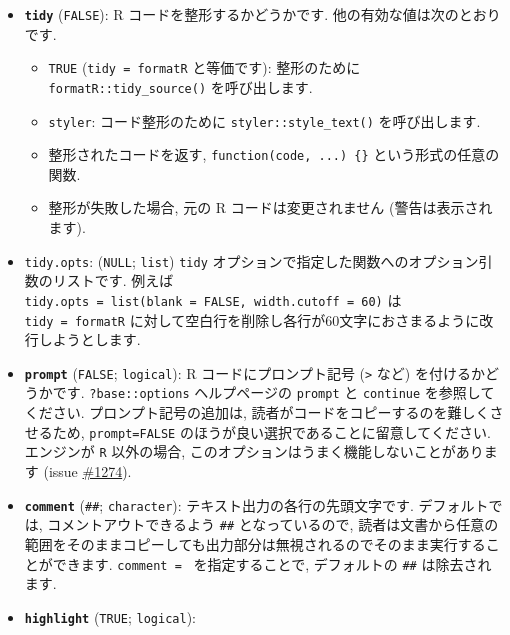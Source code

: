 \documentclass[
  lualatex,ja=standard,jafont=noto-otf]{bxjsreport}
\providecommand{\tightlist}{%
  \setlength{\itemsep}{0pt}\setlength{\parskip}{0pt}}
\begin{document}
\begin{itemize}
\item
  \textbf{\texttt{tidy}} (\texttt{FALSE}): R
  コードを整形するかどうかです. 他の有効な値は次のとおりです.

  \begin{itemize}
  \tightlist
  \item
    \texttt{TRUE}
    (\texttt{tidy\ =\ \textquotesingle{}formatR\textquotesingle{}}
    と等価です): 整形のために \texttt{formatR::tidy\_source()}
    を呼び出します.
  \item
    \texttt{\textquotesingle{}styler\textquotesingle{}}:
    コード整形のために \texttt{styler::style\_text()} を呼び出します.
  \item
    整形されたコードを返す, \texttt{function(code,\ ...)\ \{\}}
    という形式の任意の関数.
  \item
    整形が失敗した場合, 元の R コードは変更されません
    (警告は表示されます).
  \end{itemize}
\item
  \texttt{tidy.opts}: (\texttt{NULL}; \texttt{list}) \texttt{tidy}
  オプションで指定した関数へのオプション引数のリストです. 例えば
  \texttt{tidy.opts\ =\ list(blank\ =\ FALSE,\ width.cutoff\ =\ 60)} は
  \texttt{tidy\ =\ \textquotesingle{}formatR\textquotesingle{}}
  に対して空白行を削除し各行が60文字におさまるように改行しようとします.
\item
  \textbf{\texttt{prompt}} (\texttt{FALSE}; \texttt{logical}): R
  コードにプロンプト記号 (\texttt{\textgreater{}} など)
  を付けるかどうかです. \texttt{?base::options} ヘルプページの
  \texttt{prompt} と \texttt{continue} を参照してください.
  プロンプト記号の追加は, 読者がコードをコピーするのを難しくさせるため,
  \texttt{prompt=FALSE} のほうが良い選択であることに留意してください.
  エンジンが \texttt{R} 以外の場合,
  このオプションはうまく機能しないことがあります (issue
  \href{https://github.com/yihui/knitr/issues/1274}{\#1274}).
\item
  \textbf{\texttt{comment}}
  (\texttt{\textquotesingle{}\#\#\textquotesingle{}};
  \texttt{character}): テキスト出力の各行の先頭文字です. デフォルトでは,
  コメントアウトできるよう \texttt{\#\#} となっているので,
  読者は文書から任意の範囲をそのままコピーしても出力部分は無視されるのでそのまま実行することができます.
  \texttt{comment\ =\ \textquotesingle{}\textquotesingle{}}
  を指定することで, デフォルトの \texttt{\#\#} は除去されます.
\item
  \textbf{\texttt{highlight}} (\texttt{TRUE}; \texttt{logical}):

\end{itemize}
\end{document}
